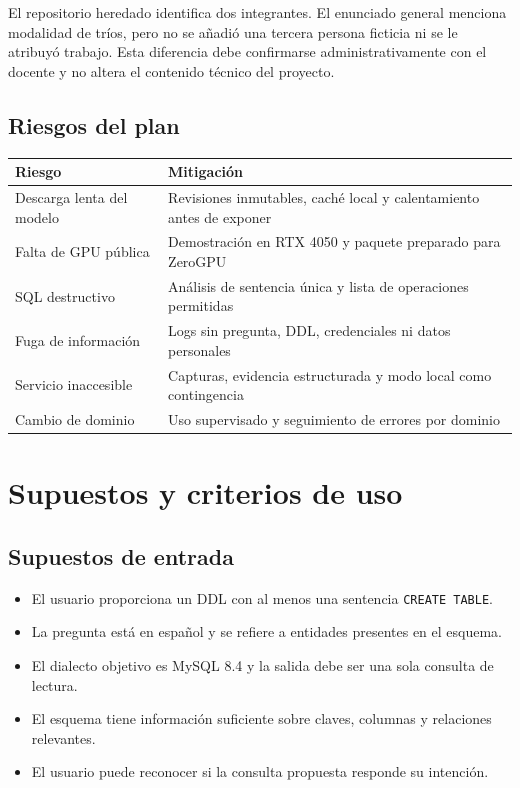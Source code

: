 \documentclass[11pt,letterpaper]{article}
\newcommand{\code}[1]{\texttt{#1}}
\begin{document}
El repositorio heredado identifica dos integrantes. El enunciado general menciona modalidad de
tríos, pero no se añadió una tercera persona ficticia ni se le atribuyó trabajo. Esta diferencia debe
confirmarse administrativamente con el docente y no altera el contenido técnico del proyecto.

\subsection{Riesgos del plan}

\begin{tabularx}{\textwidth}{@{}XX@{}}
\toprule
\textbf{Riesgo} & \textbf{Mitigación}\\
\midrule
Descarga lenta del modelo & Revisiones inmutables, caché local y calentamiento antes de exponer\\
Falta de GPU pública & Demostración en RTX 4050 y paquete preparado para ZeroGPU\\
SQL destructivo & Análisis de sentencia única y lista de operaciones permitidas\\
Fuga de información & Logs sin pregunta, DDL, credenciales ni datos personales\\
Servicio inaccesible & Capturas, evidencia estructurada y modo local como contingencia\\
Cambio de dominio & Uso supervisado y seguimiento de errores por dominio\\
\bottomrule
\end{tabularx}

\section{Supuestos y criterios de uso}

\subsection{Supuestos de entrada}

\begin{itemize}
  \item El usuario proporciona un DDL con al menos una sentencia \code{CREATE TABLE}.
  \item La pregunta está en español y se refiere a entidades presentes en el esquema.
  \item El dialecto objetivo es MySQL 8.4 y la salida debe ser una sola consulta de lectura.
  \item El esquema tiene información suficiente sobre claves, columnas y relaciones relevantes.
  \item El usuario puede reconocer si la consulta propuesta responde su intención.
\end{itemize}
\end{document}
